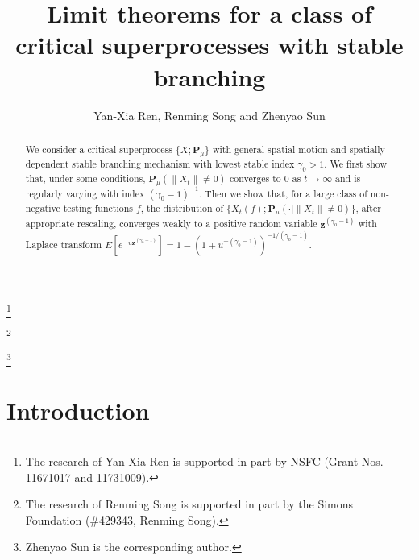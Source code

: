 \documentclass[12pt,a4paper]{amsart}
\theoremstyle{definition}
\numberwithin{equation}{section}
\begin{document}
\title
[Superprocesses with stable branching]
{\large Limit theorems for a class of critical superprocesses with stable branching}
\author[Y.-X. Ren, R. Song and Z. Sun]{Yan-Xia Ren, Renming Song and Zhenyao Sun}
\address
{Yan-Xia Ren\\
	School of Mathematical Sciences\\
	Peking University\\
	Beijing, P. R. China, 100871}
\thanks{The research of Yan-Xia Ren is supported in part by NSFC (Grant Nos. 11671017  and 11731009).}
\address
{Renming Song\\
	Dept of Mathematics\\
	University of Illinois at Urbana-Champaign\\
	Urbana, IL 61801}
\thanks{The research of Renming Song is supported in part by the Simons Foundation (\#429343, Renming Song).}
\address
{Zhenyao Sun\\
	School of Mathematical Sciences\\
	Peking University\\
	Beijing, P. R. China, 100871}
\thanks{Zhenyao Sun is the corresponding author.}
\begin{abstract}
  We consider a critical superprocess $\{X;\mathbf P_\mu\}$ with general spatial motion and spatially dependent stable branching mechanism with lowest stable index $\gamma_0 > 1$. We first show that, under some conditions, $\mathbf P_{\mu}(\|X_t\|\neq 0)$ converges to $0$ as $t\to \infty$ and is regularly varying with index $(\gamma_0-1)^{-1}$. Then we show that, for a large class of non-negative testing functions $f$, the distribution of $\{X_t(f);\mathbf P_\mu(\cdot|\|X_t\|\neq 0)\}$, after appropriate rescaling, converges weakly to a positive random variable $\mathbf z^{(\gamma_0-1)}$ with Laplace transform $E[e^{-u\mathbf z^{(\gamma_0-1)}}]=1-(1+u^{-(\gamma_0-1)})^{-1/(\gamma_0-1)}.$
\end{abstract}
\maketitle
\section{Introduction}
\end{document}
